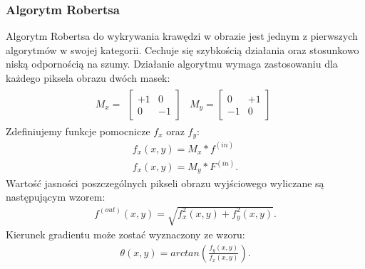 \subsubsection{Algorytm Robertsa}
Algorytm Robertsa do wykrywania krawędzi w obrazie jest jednym z pierwszych algorytmów w swojej kategorii. Cechuje się szybkością działania oraz stosunkowo niską odpornością na szumy. Działanie algorytmu wymaga zastosowaniu dla każdego piksela obrazu dwóch masek:
\begin{gather*}
  M_x = \begin{matrix}
    \begin{bmatrix}
      +1 & 0 \\
      0 & -1
    \end{bmatrix}
    &
    M_y = \begin{bmatrix}
      0 & +1 \\
      -1 & 0
    \end{bmatrix}
  \end{matrix}
\end{gather*}
Zdefiniujemy funkcje pomocnicze $f_x$ oraz $f_y$:
\begin{gather*}
  f_x(x, y) = M_x * f^{(in)} \\
  f_x(x, y) = M_y * F^{(in)}.
\end{gather*}
Wartość jasności poszczególnych pikseli obrazu wyjściowego wyliczane są następującym wzorem:
\begin{gather*}
  f^{(out)}(x, y) = \sqrt{f_x^2(x, y)+f_{y}^2(x, y)}.
\end{gather*}
Kierunek gradientu może zostać wyznaczony ze wzoru:
\begin{gather*}
  \theta(x, y) = arctan(\frac{f_{y}(x, y)}{f_{x}(x, y)}).
\end{gather*}
